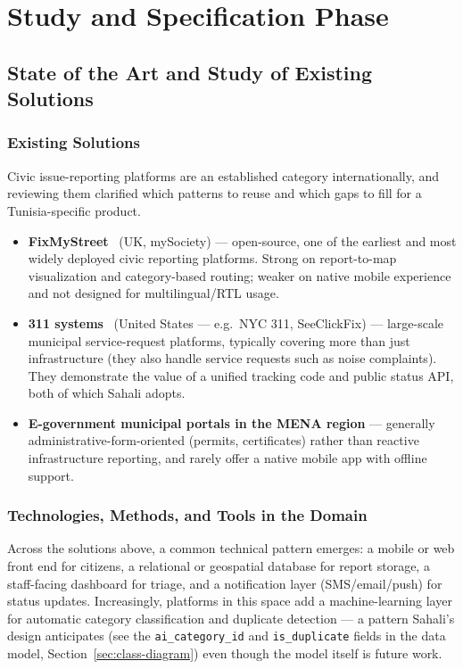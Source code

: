 \chapter{Study and Specification Phase}
\label{chap:etude}

\section{State of the Art and Study of Existing Solutions}
\label{sec:etat-art}

\subsection{Existing Solutions}

Civic issue-reporting platforms are an established category internationally, and reviewing them clarified which patterns to reuse and which gaps to fill for a Tunisia-specific product.

\begin{itemize}[leftmargin=*]
  \item \textbf{FixMyStreet}~\cite{fixmystreet} (UK, mySociety) --- open-source, one of the earliest and most widely deployed civic reporting platforms. Strong on report-to-map visualization and category-based routing; weaker on native mobile experience and not designed for multilingual/RTL usage.
  \item \textbf{311 systems}~\cite{nyc311} (United States --- e.g.\ NYC 311, SeeClickFix) --- large-scale municipal service-request platforms, typically covering more than just infrastructure (they also handle service requests such as noise complaints). They demonstrate the value of a unified tracking code and public status API, both of which Sahali adopts.
  \item \textbf{E-government municipal portals in the MENA region} --- generally administrative-form-oriented (permits, certificates) rather than reactive infrastructure reporting, and rarely offer a native mobile app with offline support.
\end{itemize}

\subsection{Technologies, Methods, and Tools in the Domain}

Across the solutions above, a common technical pattern emerges: a mobile or web front end for citizens, a relational or geospatial database for report storage, a staff-facing dashboard for triage, and a notification layer (SMS/email/push) for status updates. Increasingly, platforms in this space add a machine-learning layer for automatic category classification and duplicate detection --- a pattern Sahali's design anticipates (see the \texttt{ai\_category\_id} and \texttt{is\_duplicate} fields in the data model, Section~\ref{sec:class-diagram}) even though the model itself is future work.


